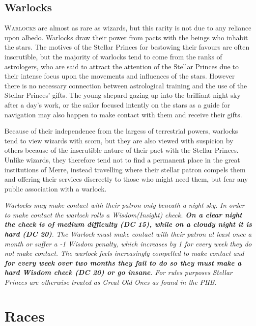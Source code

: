 \documentclass[paper=a4, fontsize=11pt]{scrartcl} %
\begin{document}
\begin{multicols}{2}
\subsection{Warlocks}

\lettrine[lines=2]{\medievalsharp W}{arlocks} are almost as rare as wizards, but this rarity is not due to any reliance upon albedo. Warlocks draw their power from pacts with the beings who inhabit the stars. The motives of the Stellar Princes for bestowing their favours are often inscrutible, but the majority of warlocks tend to come from the ranks of astrologers, who are said to attract the attention of the Stellar Princes due to their intense focus upon the movements and influences of the stars. However there is no necessary connection between astrological training and the use of the Stellar Princes' gifts. The young shepard gazing up into the brilliant night sky after a day's work, or the sailor focused intently on the stars as a guide for navigation may also happen to make contact with them and receive their gifts. 

Because of their independence from the largess of terrestrial powers, warlocks tend to view wizards with scorn, but they are also viewed with suspicion by others because of the inscrutible nature of their pact with the Stellar Princes. Unlike wizards, they therefore tend not to find a permanent place in the great institutions of Merre, instead travelling where their stellar patron compels them and offering their services discreetly to those who might need them, but fear any public association with a warlock.

\textit{Warlocks may make contact with their patron only beneath a night sky. In order to make contact the warlock rolls a Wisdom(Insight) check. \textbf{On a clear night the check is of medium difficulty (DC 15), while on a cloudy night it is hard (DC 20)}. The Warlock must make contact with their patron at least once a month or suffer a -1 Wisdom penalty, which increases by 1 for every week they do not make contact. The warlock feels increasingly compelled to make contact and \textbf{for every week over two months they fail to do so they must make a hard Wisdom check (DC 20) or go insane}. For rules purposes Stellar Princes are otherwise treated as Great Old Ones as found in the PHB.}

\end{multicols}

\pagebreak

\section{Races}
\end{document}
